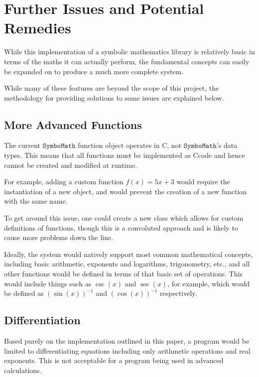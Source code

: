 \documentclass[12pt]{article}
\def\CC{{C\nolinebreak[4]\hspace{-.05em}\raisebox{.4ex}{\tiny\bf ++ }}}
\def\Symbo{{$\texttt{SymboMath}$}}
\begin{document}
\pagebreak

\section{Further Issues and Potential Remedies}

While this implementation of a symbolic mathematics library is relatively basic in terms of the maths it can actually perform, the fundamental concepts can easily be expanded on to produce a much more complete system.

While many of these features are beyond the scope of this project, the methodology for providing solutions to some issues are explained below.

\subsection{More Advanced Functions}

The current \Symbo{} function object operates in \CC, not \Symbo's data types. This means that all functions must be implemented as \CC code and hence cannot be created and modified at runtime.

For example, adding a custom function $f(x) = 5x+3$ would require the instantiation of a new  object, and would prevent the creation of a new function with the same name.

To get around this issue, one could create a new  class which allows for custom definitions of functions, though this is a convoluted approach and is likely to cause more problems down the line.

Ideally, the system would natively support most common mathematical concepts, including basic arithmetic, exponents and logarithms, trigonometry, etc., and all other functions would be defined in terms of that basic set of operations. This would include things such as $\csc(x)$ and $\sec(x)$, for example, which would be defined as $\left(\sin(x)\right)^{-1}$ and $\left(\cos(x)\right)^{-1}$ respectively.

\subsection{Differentiation}

Based purely on the implementation outlined in this paper, a program would be limited to differentiating equations including only arithmetic operations and real exponents. This is not acceptable for a program being used in advanced calculations.
\end{document}
